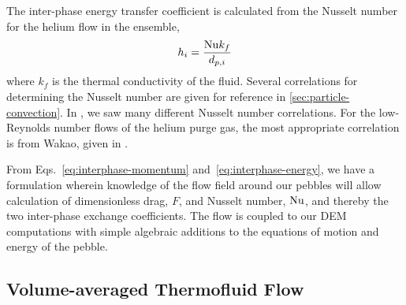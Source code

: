 The inter-phase energy transfer coefficient is calculated from the Nusselt number for the helium flow in the ensemble,
\begin{equation}\label{eq:interphase-energy}
	h_i = \frac{\mathrm{Nu} k_f}{d_{p,i}}
\end{equation}
where $k_f$ is the thermal conductivity of the fluid. Several correlations for determining the Nusselt number are given for reference in \cref{sec:particle-convection}. In , we saw many different Nusselt number correlations. For the low-Reynolds number flows of the helium purge gas, the most appropriate correlation is from Wakao\etal, given in .


From Eqs.~\ref{eq:interphase-momentum} and~\ref{eq:interphase-energy}, we have a formulation wherein knowledge of the flow field around our pebbles will allow calculation of dimensionless drag, $F$, and Nusselt number, $\mathrm{Nu}$,  and thereby the two inter-phase exchange coefficients. The flow is coupled to our DEM computations with simple algebraic additions to the equations of motion and energy of the pebble.




\subsection{Volume-averaged Thermofluid Flow}

